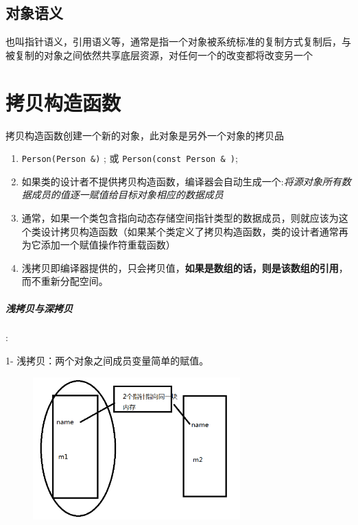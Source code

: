 \documentclass[UTF8,a4paper,12pt]{ctexbook} %
\begin{document}
	\subsection{对象语义}
		也叫指针语义，引用语义等，通常是指一个对象被系统标准的复制方式复制后，与被复制的对象之间依然共享底层资源，对任何一个的改变都将改变另一个
	
\section{拷贝构造函数} 拷贝构造函数创建一个新的对象，此对象是另外一个对象的拷贝品
	       \begin{enumerate}[fullwidth,itemindent=2em,label=(\arabic*)]		       
		       \item  \verb|Person(Person &)| ; 或 \verb|Person(const Person & )|;
		       
		       \item  如果类的设计者不提供拷贝构造函数，编译器会自动生成一个:\textit{将源对象所有数据成员的值逐一赋值给目标对象相应的数据成员}
		       
		       \item   通常，如果一个类包含指向动态存储空间指针类型的数据成员，则就应该为这个类设计拷贝构造函数（如果某个类定义了拷贝构造函数，类的设计者通常再为它添加一个赋值操作符重载函数）
		       
		       \item   浅拷贝即编译器提供的，只会拷贝值，\textbf{如果是数组的话，则是该数组的引用}，而不重新分配空间。  
		 \end{enumerate}   
		       \subparagraph{浅拷贝与深拷贝}:
		       
		       1- 浅拷贝：两个对象之间成员变量简单的赋值。
		       
		       \begin{figure}[h]
		       	   \centering
		       	   \includegraphics[width=8cm,clip]{weakCopy.png}
		       \end{figure}
		       
\end{document}
